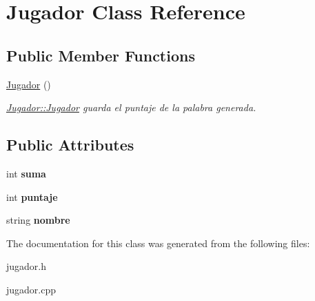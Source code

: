 \hypertarget{class_jugador}{}\section{Jugador Class Reference}
\label{class_jugador}
\subsection*{Public Member Functions}
\begin{DoxyCompactItemize}
\item 
\mbox{\label{class_jugador_a232c46f75691af6210096e5972535d71}} 
\hyperlink{class_jugador_a232c46f75691af6210096e5972535d71}{Jugador} ()
\begin{DoxyCompactList}\small\item\em \hyperlink{class_jugador_a232c46f75691af6210096e5972535d71}{Jugador\+::\+Jugador} guarda el puntaje de la palabra generada. \end{DoxyCompactList}\end{DoxyCompactItemize}
\subsection*{Public Attributes}
\begin{DoxyCompactItemize}
\item 
\mbox{\label{class_jugador_a1aa636b8f9dcd5ab2fc31888f8a2810b}} 
int {\bfseries suma}
\item 
\mbox{\label{class_jugador_a4275505ac895e00dce96e21a3cdcb068}} 
int {\bfseries puntaje}
\item 
\mbox{\label{class_jugador_ae173555c513c4267f92c915e94c7e524}} 
string {\bfseries nombre}
\end{DoxyCompactItemize}


The documentation for this class was generated from the following files\+:\begin{DoxyCompactItemize}
\item 
jugador.\+h\item 
jugador.\+cpp\end{DoxyCompactItemize}
